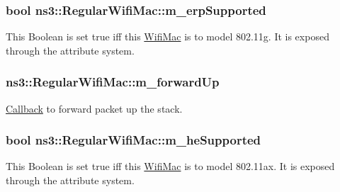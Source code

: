 \subsubsection[{\texorpdfstring{m\+\_\+erp\+Supported}{m_erpSupported}}]{\setlength{\rightskip}{0pt plus 5cm}bool ns3\+::\+Regular\+Wifi\+Mac\+::m\+\_\+erp\+Supported\hspace{0.3cm}{\ttfamily [protected]}}\hypertarget{classns3_1_1RegularWifiMac_ab90230e9a9ea6331758a53a316ee2b38}{}\label{classns3_1_1RegularWifiMac_ab90230e9a9ea6331758a53a316ee2b38}
This Boolean is set {\ttfamily true} iff this \hyperlink{classns3_1_1WifiMac}{Wifi\+Mac} is to model 802.\+11g. It is exposed through the attribute system. 
\subsubsection[{\texorpdfstring{m\+\_\+forward\+Up}{m_forwardUp}}]{ ns3\+::\+Regular\+Wifi\+Mac\+::m\+\_\+forward\+Up\hspace{0.3cm}{\ttfamily [protected]}}\hypertarget{classns3_1_1RegularWifiMac_a8ebd1a94f84014418fc3b04d2ea36aaa}{}\label{classns3_1_1RegularWifiMac_a8ebd1a94f84014418fc3b04d2ea36aaa}


\hyperlink{classns3_1_1Callback}{Callback} to forward packet up the stack. 

\subsubsection[{\texorpdfstring{m\+\_\+he\+Supported}{m_heSupported}}]{\setlength{\rightskip}{0pt plus 5cm}bool ns3\+::\+Regular\+Wifi\+Mac\+::m\+\_\+he\+Supported\hspace{0.3cm}{\ttfamily [protected]}}\hypertarget{classns3_1_1RegularWifiMac_a9458143c722fa0b6e5d223d41585842a}{}\label{classns3_1_1RegularWifiMac_a9458143c722fa0b6e5d223d41585842a}
This Boolean is set {\ttfamily true} iff this \hyperlink{classns3_1_1WifiMac}{Wifi\+Mac} is to model 802.\+11ax. It is exposed through the attribute system. 
